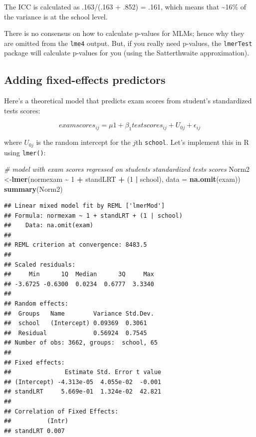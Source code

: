 \documentclass[
]{book}
\newenvironment{Shaded}{\begin{snugshade}}{\end{snugshade}}
\newcommand{\CommentTok}[1]{\textcolor[rgb]{0.56,0.35,0.01}{\textit{#1}}}
\newcommand{\DataTypeTok}[1]{\textcolor[rgb]{0.13,0.29,0.53}{#1}}
\newcommand{\DecValTok}[1]{\textcolor[rgb]{0.00,0.00,0.81}{#1}}
\newcommand{\KeywordTok}[1]{\textcolor[rgb]{0.13,0.29,0.53}{\textbf{#1}}}
\newcommand{\NormalTok}[1]{#1}
\newcommand{\OperatorTok}[1]{\textcolor[rgb]{0.81,0.36,0.00}{\textbf{#1}}}
\newcommand{\StringTok}[1]{\textcolor[rgb]{0.31,0.60,0.02}{#1}}
\begin{document}
The ICC is calculated as .163/(.163 + .852) = .161, which means that \textasciitilde16\% of the variance is at the school level.

There is no consensus on how to calculate p-values for MLMs; hence why they are omitted from the \texttt{lme4} output. But, if you really need p-values, the \texttt{lmerTest} package will calculate p-values for you (using the Satterthwaite approximation).

\hypertarget{adding-fixed-effects-predictors}{%
\subsection{Adding fixed-effects predictors}\label{adding-fixed-effects-predictors}}

Here's a theoretical model that predicts exam scores from student's standardized tests scores:

\begin{alert}

\[
examscores_{ij} = \mu1 + \beta_1testscores_{ij} + U_{0j} + \epsilon_{ij}
\]

\end{alert}

where \(U_{0j}\) is the random intercept for the \(j\)th \texttt{school}. Let's implement this in R using \texttt{lmer()}:

\begin{Shaded}
\begin{Highlighting}[]
  \CommentTok{\# model with exam scores regressed on student\textquotesingle{}s standardized tests scores}
\NormalTok{  Norm2 \textless{}{-}}\KeywordTok{lmer}\NormalTok{(normexam }\OperatorTok{\textasciitilde{}}\StringTok{ }\DecValTok{1} \OperatorTok{+}\StringTok{ }\NormalTok{standLRT }\OperatorTok{+}\StringTok{ }\NormalTok{(}\DecValTok{1} \OperatorTok{|}\StringTok{ }\NormalTok{school),}
               \DataTypeTok{data =} \KeywordTok{na.omit}\NormalTok{(exam)) }
  \KeywordTok{summary}\NormalTok{(Norm2) }
\end{Highlighting}
\end{Shaded}

\begin{verbatim}
## Linear mixed model fit by REML ['lmerMod']
## Formula: normexam ~ 1 + standLRT + (1 | school)
##    Data: na.omit(exam)
## 
## REML criterion at convergence: 8483.5
## 
## Scaled residuals: 
##     Min      1Q  Median      3Q     Max 
## -3.6725 -0.6300  0.0234  0.6777  3.3340 
## 
## Random effects:
##  Groups   Name        Variance Std.Dev.
##  school   (Intercept) 0.09369  0.3061  
##  Residual             0.56924  0.7545  
## Number of obs: 3662, groups:  school, 65
## 
## Fixed effects:
##               Estimate Std. Error t value
## (Intercept) -4.313e-05  4.055e-02  -0.001
## standLRT     5.669e-01  1.324e-02  42.821
## 
## Correlation of Fixed Effects:
##          (Intr)
## standLRT 0.007
\end{verbatim}
\end{document}
